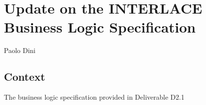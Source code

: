 \chapter{Update on the INTERLACE Business Logic Specification}
\label{ch:UpdateBLS}

\vspace{-1cm}
\begin{center}
Paolo Dini
\end{center}

\section{Context}
The business logic specification provided in Deliverable D2.1 \cite{INTERLACE_D21}







